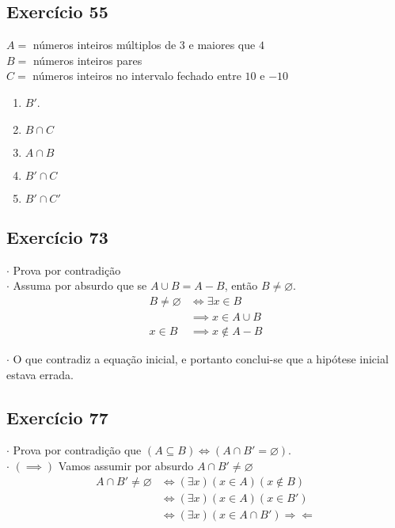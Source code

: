 \documentclass[12pt,a4paper]{article}
\begin{document}
\subsection*{Exercício 55}
$A=$ números inteiros múltiplos de $3$ e maiores que $4$\\
$B=$ números inteiros pares \\
$C=$ números inteiros no intervalo fechado entre $10$ e $-10$
\begin{enumerate}[label=\textbf{\alph*.}]
\item $B'$.
\item $B \cap C $
\item $A\cap B $
\item $B'\cap C $
\item $B'\cap C' $
\end{enumerate}
\subsection*{Exercício 73}
$\cdot$ Prova por contradição \\ 

$\cdot$ Assuma por absurdo que se $A \cup B = A-B$, então $B \neq \varnothing$. \\
\begin{equation*}
\begin{split}
B \neq \varnothing & \iff \exists x  \in B \\
&\implies x \in A \cup B \\
x \in B & \implies  x\not\in A-B
\end{split}
\end{equation*}

$\cdot$ O que contradiz a equação inicial, e portanto conclui-se que a hipótese inicial estava errada.

\subsection*{Exercício 77}
$\cdot$ Prova por contradição que $(A \subseteq B) \iff (A\cap B' = \varnothing)$. \\ 

$\cdot$ $(\implies)$ Vamos assumir por absurdo $A\cap B' \neq \varnothing$
\begin{equation*}
\begin{split}
A\cap B' \neq \varnothing &\iff (\exists x)(x\in A)(x\not\in B) \\
&\iff (\exists x)(x\in A)(x\in B') \\
&\iff (\exists x)(x\in A\cap B') \Rightarrow\Leftarrow
\end{split}
\end{equation*} \\
\end{document}
